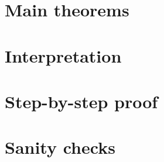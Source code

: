 \documentclass[11pt]{article}
\theoremstyle{definition}
\theoremstyle{plain}
\theoremstyle{remark}
\begin{document}
\section{Main theorems}

\section{Interpretation}

\section{Step-by-step proof}

\section{Sanity checks}
\end{document}
